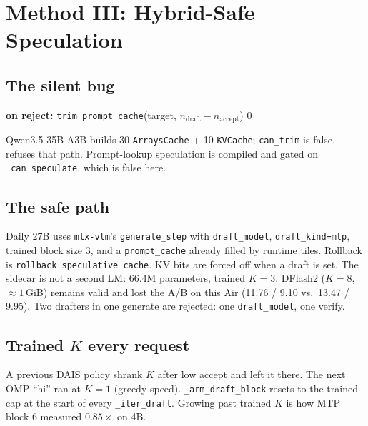 \section{Method III: Hybrid-Safe Speculation}
\label{sec:spec}

\subsection{The silent bug}

\begin{algorithm}[t]
\caption{Unsafe rewind (mlx-lm class)}
\begin{algorithmic}[1]
\State \textbf{on reject:} \texttt{trim\_prompt\_cache}(target, $n_{\mathrm{draft}}-n_{\mathrm{accept}}$)
  \State \Return $0$ 
\EndIf
\end{algorithmic}
\end{algorithm}

Qwen3.5-35B-A3B builds 30 \texttt{ArraysCache} + 10 \texttt{KVCache}; \texttt{can\_trim} is false. \slotbank{} refuses that path. Prompt-lookup speculation is compiled and gated on \texttt{\_can\_speculate}, which is false here.

\subsection{The safe path}

Daily 27B uses \texttt{mlx-vlm}'s \texttt{generate\_step} with \texttt{draft\_model}, \texttt{draft\_kind=mtp}, trained block size 3, and a \texttt{prompt\_cache} already filled by runtime tiles. Rollback is \texttt{rollback\_speculative\_cache}. KV bits are forced off when a draft is set. The sidecar is not a second LM: 66.4M parameters, trained $K{=}3$. DFlash2 ($K{=}8$, $\approx 1$\,GiB) remains valid and lost the A/B on this Air (11.76 / 9.10 vs.\ 13.47 / 9.95). Two drafters in one generate are rejected: one \texttt{draft\_model}, one verify.

\subsection{\texorpdfstring{Trained $K$ every request}{Trained K every request}}

A previous DAIS policy shrank $K$ after low accept and left it there. The next OMP ``hi'' ran at $K{=}1$ (greedy speed). \texttt{\_arm\_draft\_block} resets to the trained cap at the start of every \texttt{\_iter\_draft}. Growing past trained $K$ is how MTP block 6 measured $0.85\times$ on 4B.

